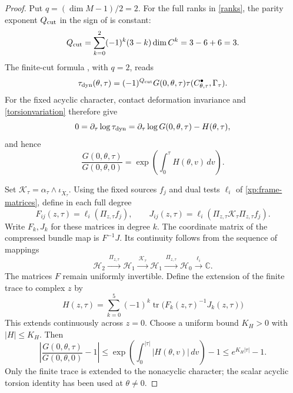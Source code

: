 \documentclass[11pt,letterpaper,reqno]{amsart}
\theoremstyle{remark}
\newcommand{\tr}{\operatorname{tr}}
\begin{document}
\begin{proof}
Put $q=(\dim M-1)/2=2$. For the full ranks in \eqref{ranks},
the parity exponent $Q_{\rm cut}$ in the sign of
\cite[(6.6)]{CD} is constant:
\[
 Q_{\rm cut}
    =\sum_{k=0}^{2}(-1)^k(3-k)\dim C^k
    =3-6+6=3.
\]
The finite-cut formula \cite[(6.6)]{CD}, with $q=2$, reads
\begin{equation}\label{dynamicalbridge}
 \tau_{\rm dyn}(\theta,\tau)
 =(-1)^{Q_{\rm cut}}G(0,\theta,\tau)
   \tau(C^\bullet_{\theta,\tau},\Gamma_\tau).
\end{equation}
For the fixed acyclic character, contact deformation invariance and
\eqref{torsionvariation} therefore give
\[
 0=\partial_\tau\log\tau_{\rm dyn}
   =\partial_\tau\log G(0,\theta,\tau)-H(\theta,\tau),
\]
and hence
\[
 \frac{G(0,\theta,\tau)}{G(0,\theta,0)}
        =\exp\!\left(\int_0^\tau H(\theta,v)\,dv\right).
\]

Set \(\mathcal K_\tau=\alpha_\tau\wedge\iota_{\dot X_\tau}\).
Using the fixed sources $f_j$ and dual tests $\ell_i$ of
\eqref{xp:frame-matrices}, define in each full degree
\[
 F_{ij}(z,\tau)=\ell_i(\Pi_{z,\tau}f_j),
 \qquad
 J_{ij}(z,\tau)=\ell_i
       (\Pi_{z,\tau}\mathcal K_\tau\Pi_{z,\tau}f_j).
\]
Write $F_k,J_k$ for these matrices in degree $k$. The coordinate
matrix of the compressed bundle map is \(F^{-1}J\). Its continuity
follows from the sequence of mappings
\[
 \mathcal H_2
 \xrightarrow{\ \Pi_{z,\tau}\ }\mathcal H_1
 \xrightarrow{\ \mathcal K_\tau\ }\mathcal H_1
 \xrightarrow{\ \Pi_{z,\tau}\ }\mathcal H_0
 \xrightarrow{\ \ell_i\ }\mathbb C.
\]
The matrices \(F\) remain uniformly invertible. Define the
extension of the finite trace to complex $z$ by
\[
 H(z,\tau)=\sum_{k=0}^{5}(-1)^k
              \tr\bigl(F_k(z,\tau)^{-1}J_k(z,\tau)\bigr)
\]
This extends continuously across \(z=0\). Choose a uniform bound
$K_H>0$ with $|H|\leq K_H$. Then
\[
 \left|\frac{G(0,\theta,\tau)}{G(0,\theta,0)}-1\right|
    \leq \exp\!\left(\int_0^{|\tau|}|H(\theta,v)|\,dv\right)-1
    \leq e^{K_H|\tau|}-1.
\]
Only the finite trace is extended to the nonacyclic character;
the scalar acyclic torsion identity has been used at \(\theta\neq0\).
\end{proof}
\end{document}
